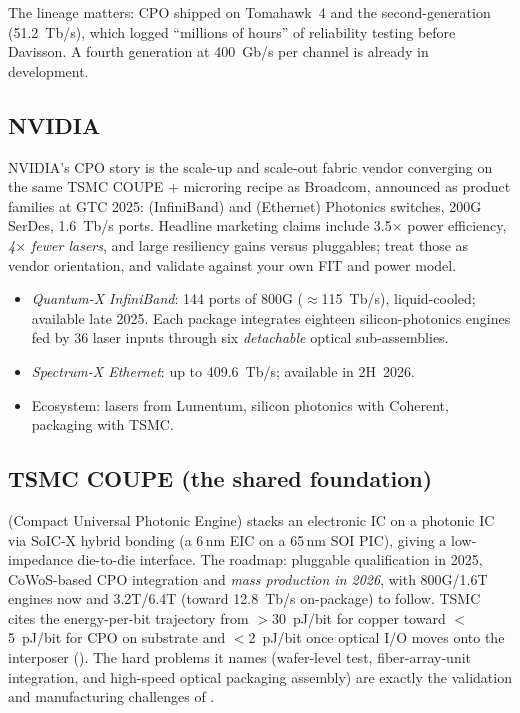 The lineage matters: CPO shipped on Tomahawk~4 and the second-generation
 (51.2~Tb/s), which logged ``millions of hours'' of reliability
testing before Davisson. A fourth generation at 400~Gb/s per channel is already in
development.

\subsection{NVIDIA}

NVIDIA's CPO story is the scale-up and scale-out fabric vendor converging on the
same TSMC COUPE + microring recipe as Broadcom, announced as product families at
GTC 2025:  (InfiniBand) and  (Ethernet) Photonics
switches, 200G SerDes, 1.6~Tb/s ports. Headline marketing claims include
3.5$\times$ power efficiency, \emph{4$\times$ fewer lasers}, and large resiliency
gains versus pluggables; treat those as vendor orientation, and validate against
your own FIT and power model.

\begin{itemize}
\item \emph{Quantum-X InfiniBand}: 144 ports of 800G ($\approx$115~Tb/s),
      liquid-cooled; available late 2025. Each package integrates eighteen
      silicon-photonics engines fed by 36 laser inputs through six
      \emph{detachable} optical sub-assemblies.
\item \emph{Spectrum-X Ethernet}: up to 409.6~Tb/s; available in 2H~2026.
\item Ecosystem: lasers from Lumentum, silicon photonics with Coherent, packaging
      with TSMC.
\end{itemize}

\subsection{TSMC COUPE (the shared foundation)}

 (Compact Universal Photonic Engine) stacks an electronic IC on a
photonic IC via SoIC-X hybrid bonding (a 6\,nm EIC on a 65\,nm SOI PIC), giving a
low-impedance die-to-die interface. The roadmap: pluggable qualification in 2025,
CoWoS-based CPO integration and \emph{mass production in 2026}, with 800G/1.6T
engines now and 3.2T/6.4T (toward 12.8~Tb/s on-package) to follow. TSMC cites the
energy-per-bit trajectory from $>$30~pJ/bit for copper toward $<$5~pJ/bit for CPO
on substrate and $<$2~pJ/bit once optical I/O moves onto the interposer
(). The hard problems it names (wafer-level test, fiber-array-unit
integration, and high-speed optical packaging assembly) are exactly the
validation and manufacturing challenges of .

